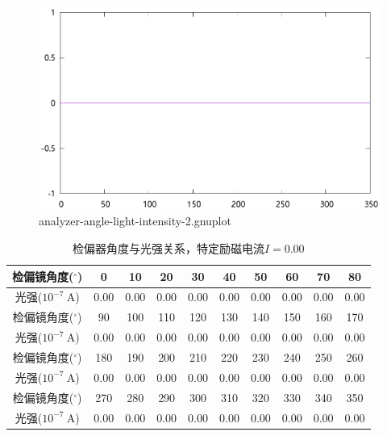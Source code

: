 \documentclass{ctexart}
\newcommand{\si}[1]{\  \mathrm{#1}}
\begin{document}
    \begin{figure}[H]
      \centering
      \includegraphics[width=\linewidth]{../output/analyzer-angle-light-intensity-2.gnuplot}
      \caption{analyzer-angle-light-intensity-2.gnuplot}
      \label{fig:analyzer-angle-light-intensity-2.gnuplot}
    \end{figure}
    \begin{table}[H]
      \centering
      \begin{tabular}{|c|c|c|c|c|c|c|c|c|c|}
        \hline
        检偏镜角度(${}^{\circ}$) & 0 & 10 & 20 & 30 & 40 & 50 & 60 & 70 & 80 \\\hline
        光强($10^{-7} \si{A}$)  & 0.00 & 0.00 & 0.00 & 0.00 & 0.00 & 0.00 & 0.00 & 0.00 & 0.00 \\\hline
        检偏镜角度(${}^{\circ}$) & 90 & 100 & 110 & 120 & 130 & 140 & 150 & 160 & 170 \\\hline
        光强($10^{-7} \si{A}$)  & 0.00 & 0.00 & 0.00 & 0.00 & 0.00 & 0.00 & 0.00 & 0.00 & 0.00  \\\hline
        检偏镜角度(${}^{\circ}$) & 180 & 190 & 200 & 210 & 220 & 230 & 240 & 250 & 260  \\\hline
        光强($10^{-7} \si{A}$)  & 0.00 & 0.00 & 0.00 & 0.00 & 0.00 & 0.00 & 0.00 & 0.00 & 0.00 \\\hline
        检偏镜角度(${}^{\circ}$) & 270 & 280 & 290 & 300 & 310 & 320 & 330 & 340 & 350 \\\hline
        光强($10^{-7} \si{A}$)  & 0.00 & 0.00 & 0.00 & 0.00 & 0.00 & 0.00 & 0.00 & 0.00 & 0.00 \\\hline
      \end{tabular}
      \caption{检偏器角度与光强关系，特定励磁电流$I=0.00$}
    \end{table}
\end{document}
